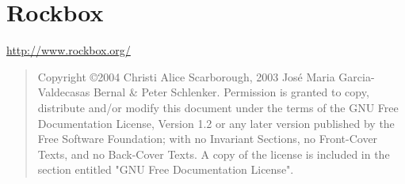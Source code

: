 \chapter*{Rockbox}

\vspace{3cm}
\noindent
\begin{center}
\url{http://www.rockbox.org/}
\end{center}

\vspace{\fill}
\begin{quote}
  Copyright \copyright 2004 Christi Alice Scarborough, 2003 Jos\'{e} Maria Garcia-Valdecasas Bernal \& Peter Schlenker.
  Permission is granted to copy, distribute and/or modify this document
  under the terms of the GNU Free Documentation License, Version 1.2
  or any later version published by the Free Software Foundation;
  with no Invariant Sections, no Front-Cover Texts, and no Back-Cover Texts.
  A copy of the license is included in the section entitled "GNU
  Free Documentation License".
\end{quote}